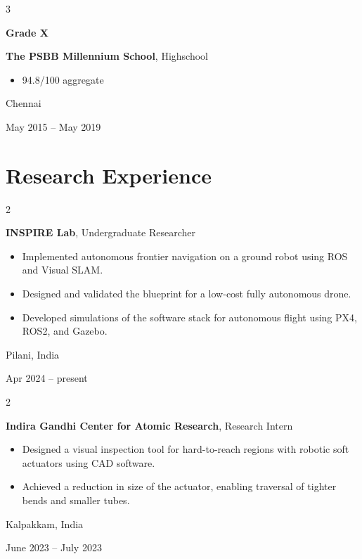 \documentclass[10pt, a4paper]{article}
\newenvironment{highlights}{
    \begin{itemize}[
        topsep=0.10 cm,
        parsep=0.10 cm,
        partopsep=0pt,
        itemsep=0pt,
        leftmargin=0.4 cm + 10pt
    ]
}{
    \end{itemize}
} %
\newenvironment{twocolentry}[2][]{
    \onecolentry
    \def\secondColumn{#2}
    \setcolumnwidth{\fill, 4 cm}
    \begin{paracol}{2}
}{
    \switchcolumn \raggedleft \secondColumn
    \end{paracol}
    \endonecolentry
} %
\newenvironment{threecolentry}[3][]{
    \onecolentry
    \def\thirdColumn{#3}
    \setcolumnwidth{1.5 cm, \fill, 4 cm}
    \begin{paracol}{3}
    {\raggedright #2} \switchcolumn
}{
    \switchcolumn \raggedleft \thirdColumn
    \end{paracol}
    \endonecolentry
} %
\begin{document}
        \vspace{0.2 cm}

        \begin{threecolentry}{\textbf{Grade X}}{
            Chennai

        May 2015 – May 2019
        }
            \textbf{The PSBB Millennium School}, Highschool
            \begin{highlights}
                \item 94.8/100 aggregate
            \end{highlights}
        \end{threecolentry}


    
    \section{Research Experience}



        
        \begin{twocolentry}{
            Pilani, India

        Apr 2024 – present
        }
            \textbf{INSPIRE Lab}, Undergraduate Researcher
            \begin{highlights}
                \item Implemented autonomous frontier navigation on a ground robot using ROS and Visual SLAM.
                \item Designed and validated the blueprint for a low-cost fully autonomous drone.
                \item Developed simulations of the software stack for autonomous flight using PX4, ROS2, and Gazebo.
            \end{highlights}
        \end{twocolentry}


        \vspace{0.2 cm}

        \begin{twocolentry}{
            Kalpakkam, India

        June 2023 – July 2023
        }
            \textbf{Indira Gandhi Center for Atomic Research}, Research Intern
            \begin{highlights}
                \item Designed a visual inspection tool for hard-to-reach regions with robotic soft actuators using CAD software.
                \item Achieved a reduction in size of the actuator, enabling traversal of tighter bends and smaller tubes.
            \end{highlights}
        \end{twocolentry}
\end{document}
